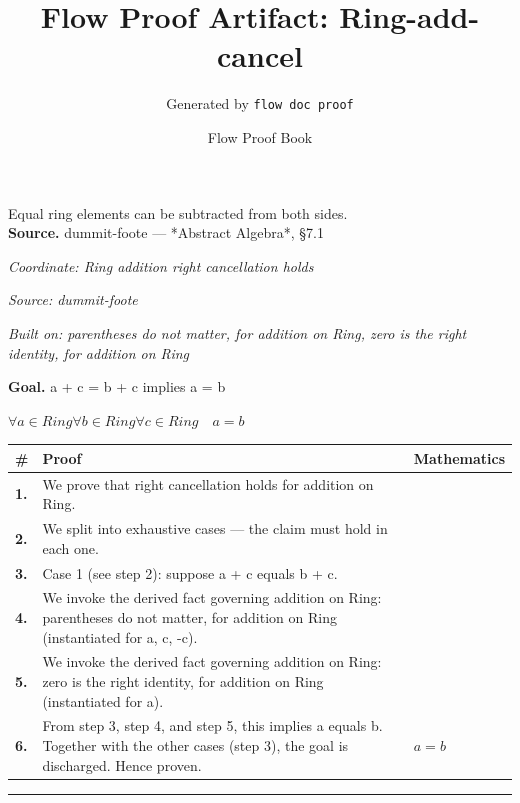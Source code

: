 \documentclass[11pt]{article}
\title{Flow Proof Artifact: Ring-add-cancel}
\author{Generated by \texttt{flow doc proof}}
\date{Flow Proof Book}
\theoremstyle{definition}
\begin{document}
\maketitle
Equal ring elements can be subtracted from both sides.\\[0.5em]
\textbf{Source.} dummit-foote — *Abstract Algebra*, §7.1\\[0.5em]
\bigskip
{}\par
\smallskip\noindent\textit{Coordinate: Ring \cdot addition \cdot right cancellation holds}\par
\smallskip\noindent\textit{Source: dummit-foote}\par
\smallskip\noindent\textit{Built on: parentheses do not matter, for addition on Ring, zero is the right identity, for addition on Ring}\par
\medskip
\noindent\textbf{Goal.} a + c = b + c implies a = b\par
\noindent$\displaystyle \forall a \in Ring \forall b \in Ring \forall c \in Ring\quad a = b$\par
\medskip
\noindent
\begin{tabular}{@{} >{\raggedright\arraybackslash}p{} >{\raggedright\arraybackslash}p{} >{\raggedleft\arraybackslash}p{} @{}}
\textbf{\#} & \textbf{Proof} & \textbf{Mathematics} \\
\midrule
\textbf{1.} & We prove that right cancellation holds for addition on Ring. & \\[0.45em]
\textbf{2.} & We split into exhaustive cases — the claim must hold in each one. & \\[0.45em]
\textbf{3.} & Case 1 (see step 2): suppose a + c  equals  b + c. & \\[0.45em]
\textbf{4.} & We invoke the derived fact governing addition on Ring: parentheses do not matter, for addition on Ring (instantiated for a, c, -c). & \\[0.45em]
\textbf{5.} & We invoke the derived fact governing addition on Ring: zero is the right identity, for addition on Ring (instantiated for a). & \\[0.45em]
\textbf{6.} & From step 3, step 4, and step 5, this implies a equals b. Together with the other cases (step 3), the goal is discharged. Hence proven. & $\displaystyle a = b$ \\[0.45em]
\bottomrule
\end{tabular}
\label{thm:Ring-addition-right_cancellation_holds}
\par\medskip\hrule
\end{document}
